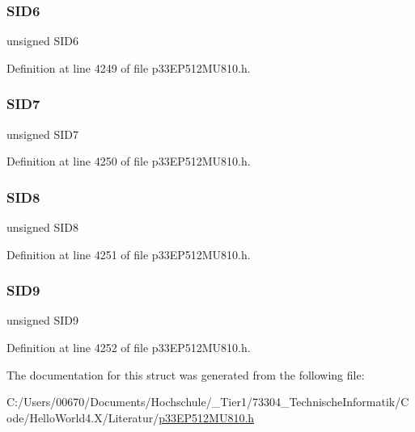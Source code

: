 \subsubsection{\texorpdfstring{S\+I\+D6}{SID6}}
{\footnotesize\ttfamily unsigned S\+I\+D6}



Definition at line 4249 of file p33\+E\+P512\+M\+U810.\+h.

\mbox{\label{structtag_c1_r_x_f9_s_i_d_b_i_t_s_a34097fb76decd431701fa2d86a22328e}} 
\subsubsection{\texorpdfstring{S\+I\+D7}{SID7}}
{\footnotesize\ttfamily unsigned S\+I\+D7}



Definition at line 4250 of file p33\+E\+P512\+M\+U810.\+h.

\mbox{\label{structtag_c1_r_x_f9_s_i_d_b_i_t_s_afe74894633244fdb0b0c01b4e8c522e7}} 
\subsubsection{\texorpdfstring{S\+I\+D8}{SID8}}
{\footnotesize\ttfamily unsigned S\+I\+D8}



Definition at line 4251 of file p33\+E\+P512\+M\+U810.\+h.

\mbox{\label{structtag_c1_r_x_f9_s_i_d_b_i_t_s_a33587704948067005c2a6a3ccc503c99}} 
\subsubsection{\texorpdfstring{S\+I\+D9}{SID9}}
{\footnotesize\ttfamily unsigned S\+I\+D9}



Definition at line 4252 of file p33\+E\+P512\+M\+U810.\+h.



The documentation for this struct was generated from the following file\+:\begin{DoxyCompactItemize}
\item 
C\+:/\+Users/00670/\+Documents/\+Hochschule/\+\_\+\+Tier1/73304\+\_\+\+Technische\+Informatik/\+Code/\+Hello\+World4.\+X/\+Literatur/\hyperlink{p33_e_p512_m_u810_8h}{p33\+E\+P512\+M\+U810.\+h}\end{DoxyCompactItemize}
